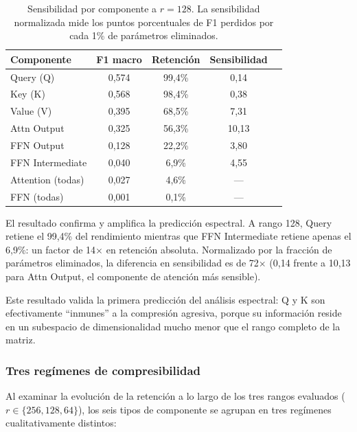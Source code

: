 \begin{table}[H]
    \centering
    \caption{Sensibilidad por componente a $r=128$. La sensibilidad normalizada mide
    los puntos porcentuales de F1 perdidos por cada 1\% de parámetros eliminados.}
    \label{tab:component-sensitivity}
    \small
    \begin{tabular}{@{}lcccc@{}}
        \toprule
        \textbf{Componente} & \textbf{F1 macro} & \textbf{Retención} & \textbf{Sensibilidad} \\
        \midrule
        Query (Q)           & 0{,}574 & 99{,}4\% & 0{,}14 \\
        Key (K)             & 0{,}568 & 98{,}4\% & 0{,}38 \\
        Value (V)           & 0{,}395 & 68{,}5\% & 7{,}31 \\
        Attn Output         & 0{,}325 & 56{,}3\% & 10{,}13 \\
        FFN Output          & 0{,}128 & 22{,}2\% & 3{,}80 \\
        FFN Intermediate    & 0{,}040 & 6{,}9\%  & 4{,}55 \\
        Attention (todas)   & 0{,}027 & 4{,}6\%  & --- \\
        FFN (todas)         & 0{,}001 & 0{,}1\%  & --- \\
        \bottomrule
    \end{tabular}
\end{table}

El resultado confirma y amplifica la predicción espectral. A rango 128, Query retiene el
99,4\% del rendimiento mientras que FFN Intermediate retiene apenas el 6,9\%: un factor
de 14$\times$ en retención absoluta. Normalizado por la fracción de parámetros
eliminados, la diferencia en sensibilidad es de 72$\times$ (0,14 frente a 10,13
para Attn Output, el componente de atención más sensible).

Este resultado valida la primera predicción del análisis espectral: Q y K son
efectivamente ``inmunes'' a la compresión agresiva, porque su información reside en un
subespacio de dimensionalidad mucho menor que el rango completo de la matriz.

\subsubsection{Tres regímenes de compresibilidad}

Al examinar la evolución de la retención a lo largo de los tres rangos evaluados
($r \in \{256, 128, 64\}$), los seis tipos de componente se agrupan en tres regímenes
cualitativamente distintos:

